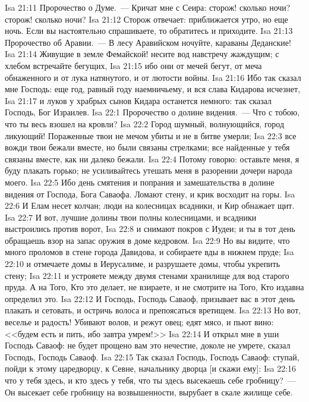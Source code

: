 \rsbpar\vs Isa 21:11 Пророчество о Думе.~--- Кричат мне с Сеира: сторож! сколько ночи? сторож! сколько ночи?
\vs Isa 21:12 Сторож отвечает: приближается утро, но еще ночь. Если вы настоятельно спрашиваете, то обратитесь и приходите.
\rsbpar\vs Isa 21:13 Пророчество об Аравии.~--- В лесу Аравийском ночуйте, караваны Деданские!
\vs Isa 21:14 Живущие в земле Фемайской! несите вод навстречу жаждущим; с хлебом встречайте бегущих,
\vs Isa 21:15 ибо они от мечей бегут, от меча обнаженного и от лука натянутого, и от лютости войны.
\vs Isa 21:16 Ибо так сказал мне Господь: еще год, равный году наемничьему, и вся слава Кидарова исчезнет,
\vs Isa 21:17 и луков у храбрых сынов Кидара останется немного: так сказал Господь, Бог Израилев.
\vs Isa 22:1 Пророчество о долине видения.~--- Что с тобою, что ты весь взошел на кровли?
\vs Isa 22:2 Город шумный, волнующийся, город ликующий! Пораженные твои не мечом убиты и не в битве умерли;
\vs Isa 22:3 все вожди твои бежали вместе, но были связаны стрелками; все найденные у тебя связаны вместе, как ни далеко бежали.
\vs Isa 22:4 Потому говорю: оставьте меня, я буду плакать горько; не усиливайтесь утешать меня в разорении дочери народа моего.
\vs Isa 22:5 Ибо день смятения и попрания и замешательства в долине видения от Господа, Бога Саваофа. Ломают стену, и крик восходит на горы.
\vs Isa 22:6 И Елам несет колчан; люди на колесницах  всадники, и Кир обнажает щит.
\vs Isa 22:7 И вот, лучшие долины твои полны колесницами, и всадники выстроились против ворот,
\vs Isa 22:8 и снимают покров с Иудеи; и ты в тот день обращаешь взор на запас оружия в доме кедровом.
\vs Isa 22:9 Но вы видите, что много проломов в стене города Давидова, и собираете вды в нижнем пруде;
\vs Isa 22:10 и отмечаете домы в Иерусалиме, и разрушаете домы, чтобы укрепить стену;
\vs Isa 22:11 и устрояете между двумя стенами хранилище для вод старого пруда. А на Того, Кто это делает, не взираете, и не смотрите на Того, Кто издавна определил это.
\vs Isa 22:12 И Господь, Господь Саваоф, призывает вас в этот день плакать и сетовать, и остричь волоса и препоясаться вретищем.
\vs Isa 22:13 Но вот, веселье и радость! Убивают волов, и режут овец; едят мясо, и пьют вино: <<будем есть и пить, ибо завтра умрем!>>
\vs Isa 22:14 И открыл мне в уши Господь Саваоф: не будет прощено вам это нечестие, доколе не умрете, сказал Господь, Господь Саваоф.
\rsbpar\vs Isa 22:15 Так сказал Господь, Господь Саваоф: ступай, пойди к этому царедворцу, к Севне, начальнику дворца [и скажи ему]:
\vs Isa 22:16 что у тебя здесь, и кто здесь у тебя, что ты здесь высекаешь себе гробницу?~--- Он высекает себе гробницу на возвышенности, вырубает в скале жилище себе.
